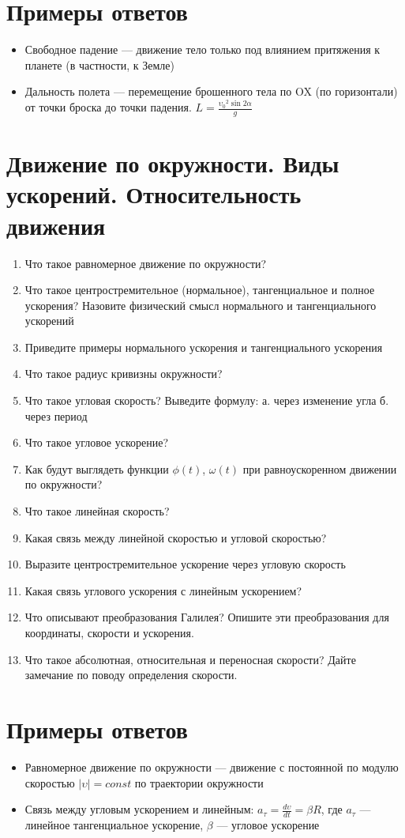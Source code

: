 \documentclass[12pt,a4paper]{report}
\begin{document}
\section{Примеры ответов}
\begin{itemize}
\item Свободное падение --- движение тело только под влиянием притяжения к планете (в частности, к Земле)
\item Дальность полета --- перемещение брошенного тела по OX (по горизонтали) от точки броска до точки падения. $L = \frac{{\upsilon_0}^2 \sin 2\alpha}{g}$
\end{itemize} 

\section{Движение по окружности. Виды ускорений. Относительность движения}
\begin{enumerate}
\item Что такое равномерное движение по окружности?
\item Что такое центростремительное (нормальное), тангенциальное и полное ускорения? Назовите физический смысл нормального и тангенциального ускорений
\item Приведите примеры нормального ускорения и тангенциального ускорения
\item Что такое радиус кривизны окружности?
\item Что такое угловая скорость? Выведите формулу: а. через изменение угла б. через период
\item Что такое угловое ускорение?
\item Как будут выглядеть функции $\phi(t)$, $\omega(t)$ при равноускоренном движении по окружности?
\item Что такое линейная скорость?
\item Какая связь между линейной скоростью и угловой скоростью?
\item Выразите центростремительное ускорение через угловую скорость
\item Какая связь углового ускорения с линейным ускорением?
\item Что описывают преобразования Галилея? Опишите эти преобразования для координаты, скорости и ускорения.
\item Что такое абсолютная, относительная и переносная скорости? Дайте замечание по поводу определения скорости.
\end{enumerate}

\section{Примеры ответов}
\begin{itemize}
\item Равномерное движение по окружности --- движение с постоянной по модулю скоростью $|\upsilon| = const$ по траектории окружности
\item Связь между угловым ускорением и линейным: $a_\tau = \frac{d\upsilon}{dt} = \beta R$, где $a_\tau$ --- линейное тангенциальное ускорение, $\beta$ --- угловое ускорение
\end{itemize} 
\end{document}
